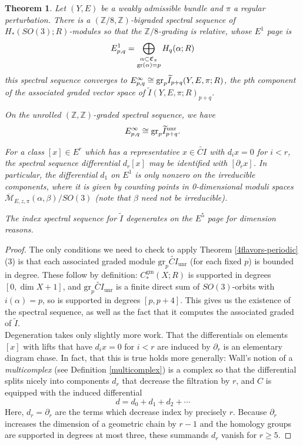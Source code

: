 \documentclass{memo-l}
\newtheorem{theorem}{Theorem}[chapter]
\theoremstyle{definition}
\theoremstyle{remark}
\numberwithin{section}{chapter}
\numberwithin{equation}{chapter}
\begin{document}
\begin{theorem}\label{IndexSS}Let $(Y,E)$ be a weakly admissible bundle and $\pi$ a regular perturbation. There is a $(\mathbb Z/8,\mathbb Z)$-bigraded spectral sequence of $H_*(SO(3);R)$-modules so that the $\mathbb Z/8$-grading is relative, whose $E^1$ page is $$E^1_{p,q} = \bigoplus_{\substack{\alpha \subset \mathfrak C_{\pi} \\ \textup{gr}(\alpha) = p}} H_q(\alpha;R)$$ this spectral sequence converges to $E^\infty_{p,q} \cong \textup{gr}_p \widetilde{I}_{p+q}(Y,E,\pi;R)$, the pth component of the associated graded vector space of $\widetilde I(Y,E,\pi;R)_{p+q}$.

On the unrolled $(\mathbb Z, \mathbb Z)$-graded spectral sequence, we have $$E^\infty_{p,q} \cong \textup{gr}_p \widetilde I^\textup{unr}_{p+q}.$$

For a class $[x] \in E^r$ which has a representative $x \in \widetilde{CI}$ with $d_i x = 0$ for $i <r$, the spectral sequence differential $d_r[x]$ may be identified with $[\partial_r x]$. In particular, the differential $d_1$ on $E^1$ is only nonzero on the irreducible components, where it is given by counting points in 0-dimensional moduli spaces $\overline{\mathcal M}_{E,z,\pi}(\alpha, \beta)/SO(3)$ (note that $\beta$ need not be irreducible).

The index spectral sequence for $\widetilde{I}$ degenerates on the $E^5$ page for dimension reasons.
\end{theorem}

\begin{proof}The only conditions we need to check to apply Theorem \ref{4flavors-periodic}(3) is that each associated graded module $\text{gr}_p \widetilde{CI}_{\text{unr}}$ (for each fixed $p$) is bounded in degree. These follow by definition: $C_*^\text{gm}(X;R)$ is supported in degrees $[0, \dim X + 1]$, and $\text{gr}_p \widetilde{CI}_{\text{unr}}$ is a finite direct sum of $SO(3)$-orbits with $i(\alpha) = p$, so is supported in degrees $[p, p+4]$. This gives us the existence of the spectral sequence, as well as the fact that it computes the associated graded of $\widetilde I$. \\

Degeneration takes only slightly more work. That the differentials on elements $[x]$ with lifts that have $d_ix = 0$ for $i < r$ are induced by $\partial_r$ is an elementary diagram chase. In fact, that this is true holds more generally: Wall's notion of a \emph{multicomplex} (see Definition \ref{multicomplex}) is a complex so that the differential splits nicely into components $d_r$ that decrease the filtration by $r$, and $C$ is equipped with the induced differential $$d = d_0 + d_1 + d_2 + \cdots$$ Here, $d_r = \partial_r$ are the terms which decrease index by precisely $r$. Because $\partial_r$ increases the dimension of a geometric chain by $r-1$ and the homology groups are supported in degrees at most three, these summands $d_r$ vanish for $r \ge 5$.
\end{proof}
\end{document}
